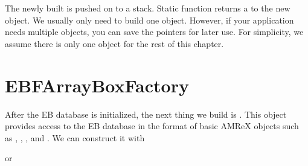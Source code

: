 \documentclass[letterpaper,10pt,english]{sphinxmanual}
\begin{document}
\sphinxAtStartPar
The newly built  is pushed on to a stack. Static function
 returns a  to the new
 object. We usually only need to build one
 object. However, if your application needs multiple
 objects, you can save the pointers for later use. For
simplicity, we assume there is only one  object for the rest of
this chapter.


\section{EBFArrayBoxFactory}
\label{\detokenize{EB:ebfarrayboxfactory}}
\sphinxAtStartPar
After the EB database is initialized, the next thing we build is
. This object provides access to the EB database in the
format of basic AMReX objects such as , ,
, and . We can construct it with

\begin{sphinxVerbatim}[commandchars=\\\{\}]
   
                      
                      
                      
                     
\end{sphinxVerbatim}

\sphinxAtStartPar
or
\end{document}
